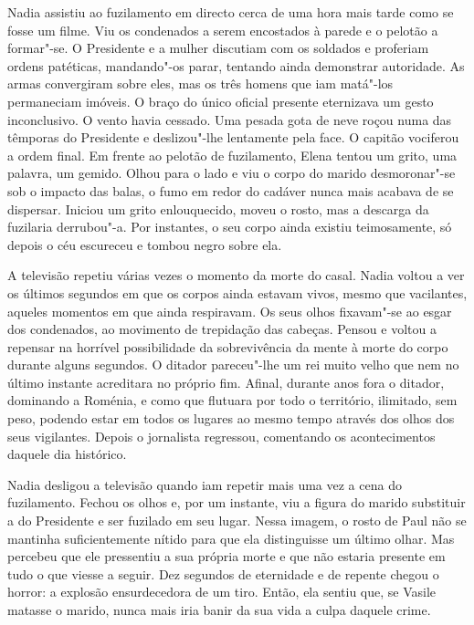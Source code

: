 \bigskip

Nadia assistiu ao fuzilamento em directo cerca de uma hora mais tarde
como se fosse um filme. Viu os condenados a serem encostados à parede
e o pelotão a formar"-se. O Presidente e a mulher discutiam com os
soldados e proferiam ordens patéticas, mandando"-os parar, tentando ainda
demonstrar autoridade. As armas convergiram sobre eles, mas os três
homens que iam matá"-los permaneciam imóveis. O braço do único oficial
presente eternizava um gesto inconclusivo. O vento havia cessado. Uma
pesada gota de neve roçou numa das têmporas do Presidente e deslizou"-lhe
lentamente pela face. O capitão vociferou a ordem final. Em frente ao
pelotão de fuzilamento, Elena tentou um grito, uma palavra, um gemido.
Olhou para o lado e viu o corpo do marido desmoronar"-se sob o impacto
das balas, o fumo em redor do cadáver nunca mais acabava de se dispersar. Iniciou um grito enlouquecido, moveu o rosto, mas
a descarga da fuzilaria derrubou"-a. Por instantes, o seu corpo ainda
existiu teimosamente, só depois o céu escureceu e tombou negro sobre
ela.

A televisão repetiu várias vezes o momento da morte do casal. Nadia
voltou a ver os últimos segundos em que os corpos ainda estavam vivos,
mesmo que vacilantes, aqueles momentos em que ainda respiravam. Os
seus olhos fixavam"-se ao esgar dos condenados, ao movimento de
trepidação das cabeças. Pensou e voltou a repensar na horrível
possibilidade da sobrevivência da mente à morte do corpo durante alguns
segundos. O ditador pareceu"-lhe um rei muito velho que nem no último
instante acreditara no próprio fim. Afinal, durante anos fora o ditador,
dominando a Roménia, e como que flutuara por todo o território,
ilimitado, sem peso, podendo estar em todos os lugares ao mesmo tempo
através dos olhos dos seus vigilantes. Depois o jornalista regressou,
comentando os acontecimentos daquele dia histórico.

Nadia desligou a televisão quando iam repetir mais uma
vez a cena do fuzilamento. Fechou os olhos e, por um instante, viu a
figura do marido substituir a do Presidente e ser fuzilado em seu lugar.
Nessa imagem, o rosto de Paul não se mantinha suficientemente nítido
para que ela distinguisse um último olhar. Mas percebeu que ele
pressentiu a sua própria morte e que não estaria presente em tudo o que
viesse a seguir. Dez segundos de eternidade e de repente chegou o
horror: a explosão ensurdecedora de um tiro. Então, ela sentiu que, se
Vasile matasse o marido, nunca mais iria banir da sua vida a culpa
daquele crime.

